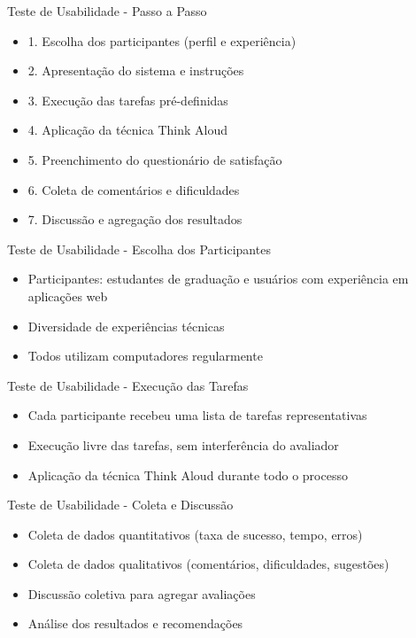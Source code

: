\documentclass[landscape, 12pt]{beamer}
\begin{document}
\begin{frame}{Teste de Usabilidade - Passo a Passo}
    \begin{itemize}
        \item 1. Escolha dos participantes (perfil e experiência)
        \item 2. Apresentação do sistema e instruções
        \item 3. Execução das tarefas pré-definidas
        \item 4. Aplicação da técnica Think Aloud
        \item 5. Preenchimento do questionário de satisfação
        \item 6. Coleta de comentários e dificuldades
        \item 7. Discussão e agregação dos resultados
    \end{itemize}
\end{frame}

\begin{frame}{Teste de Usabilidade - Escolha dos Participantes}
    \begin{itemize}
        \item Participantes: estudantes de graduação e usuários com experiência em aplicações web
        \item Diversidade de experiências técnicas
        \item Todos utilizam computadores regularmente
    \end{itemize}
\end{frame}

\begin{frame}{Teste de Usabilidade - Execução das Tarefas}
    \begin{itemize}
        \item Cada participante recebeu uma lista de tarefas representativas
        \item Execução livre das tarefas, sem interferência do avaliador
        \item Aplicação da técnica Think Aloud durante todo o processo
    \end{itemize}
\end{frame}

\begin{frame}{Teste de Usabilidade - Coleta e Discussão}
    \begin{itemize}
        \item Coleta de dados quantitativos (taxa de sucesso, tempo, erros)
        \item Coleta de dados qualitativos (comentários, dificuldades, sugestões)
        \item Discussão coletiva para agregar avaliações
        \item Análise dos resultados e recomendações
    \end{itemize}
\end{frame}
\end{document}
